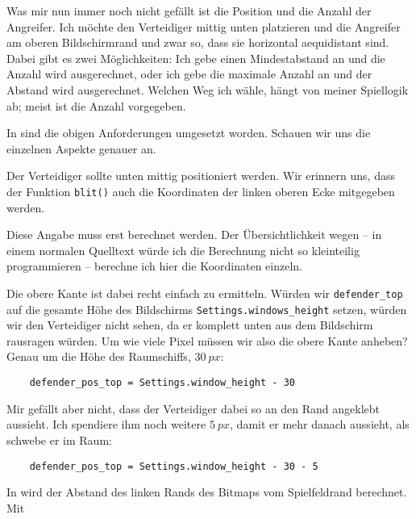 Was mir nun immer noch nicht gefällt ist die Position und die Anzahl der Angreifer. Ich möchte den Verteidiger mittig unten platzieren und die Angreifer am oberen Bildschirmrand und zwar so, dass sie horizontal  \gls{aequidistant} sind. Dabei gibt es zwei Möglichkeiten: Ich gebe einen Mindestabstand an und die Anzahl wird ausgerechnet, oder ich gebe die maximale Anzahl an und der Abstand wird ausgerechnet. Welchen Weg ich wähle, hängt von meiner Spiellogik ab; meist ist die Anzahl vorgegeben.


In  sind die obigen Anforderungen umgesetzt worden. Schauen wir uns die einzelnen Aspekte genauer an.

Der Verteidiger sollte unten mittig positioniert werden. Wir erinnern uns, dass der Funktion \texttt{blit()} auch die Koordinaten der linken oberen Ecke mitgegeben werden. 

Diese Angabe muss erst berechnet werden. Der Übersichtlichkeit wegen -- in einem normalen Quelltext würde ich die Berechnung nicht so kleinteilig programmieren -- berechne ich hier die Koordinaten einzeln.

Die obere Kante ist dabei recht einfach zu ermitteln. Würden wir \texttt{defender\_top} auf die gesamte Höhe des Bildschirms \texttt{Settings.windows\_height} setzen, würden wir den Verteidiger nicht sehen, da er komplett unten aus dem Bildschirm rausragen würden. Um wie viele Pixel müssen wir also die obere Kante anheben? Genau um die Höhe des Raumschiffs, $30~px$:

\lstset{firstnumber=24}
\begin{lstlisting}
	defender_pos_top = Settings.window_height - 30
\end{lstlisting}

Mir gefällt aber nicht, dass der Verteidiger dabei so an den Rand angeklebt aussieht. Ich spendiere ihm noch weitere $5~px$, damit er mehr danach aussieht, als schwebe er im Raum:

\lstset{firstnumber=24}
\begin{lstlisting}
	defender_pos_top = Settings.window_height - 30 - 5
\end{lstlisting}

In  wird der Abstand des linken Rands des Bitmaps vom Spielfeldrand berechnet. Mit


